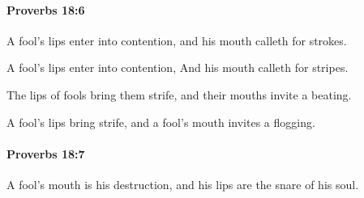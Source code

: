 		\paragraph{Proverbs 18:6} %
			\label{PROVERBS-18-6}

			A fool’s lips enter into contention, and his mouth calleth for strokes.

			\begin{versebox}
					\item[BHS] 
					\item[ASV] A fool's lips enter into contention, And his mouth calleth for stripes.
					\item[NIV] The lips of fools bring them strife, and their mouths invite a beating.
					\item[NRSV] A fool’s lips bring strife, and a fool’s mouth invites a flogging.
			\end{versebox}

		\paragraph{Proverbs 18:7} %
			\label{PROVERBS-18-7}

			A fool’s mouth is his destruction, and his lips are the snare of his soul.

